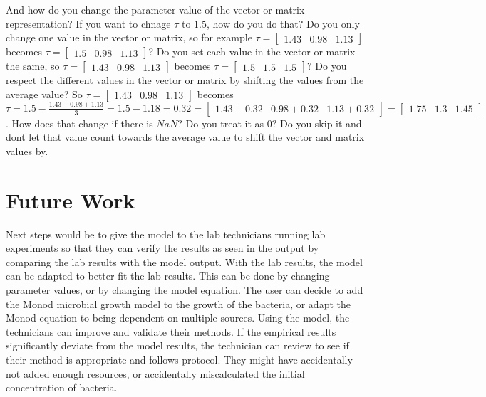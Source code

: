 And how do you change the parameter value of the vector or matrix representation? 
If you want to chnage $\tau$ to $1.5$, how do you do that? 
Do you only change one value in the vector or matrix, so for example $\tau = \begin{bmatrix} 1.43 & 0.98 & 1.13\end{bmatrix}$ becomes $\tau = \begin{bmatrix} 1.5 & 0.98 & 1.13\end{bmatrix}$? 
Do you set each value in the vector or matrix the same, so $\tau = \begin{bmatrix} 1.43 & 0.98 & 1.13\end{bmatrix}$ becomes $\tau = \begin{bmatrix} 1.5 & 1.5 & 1.5\end{bmatrix}$? 
Do you respect the different values in the vector or matrix by shifting the values from the average value? 
So $\tau = \begin{bmatrix} 1.43 & 0.98 & 1.13\end{bmatrix}$ becomes $\tau = 1.5 - \frac{1.43 + 0.98 + 1.13}{3} = 1.5-1.18 = 0.32 = \begin{bmatrix} 1.43+0.32 & 0.98+0.32 & 1.13+0.32\end{bmatrix} = \begin{bmatrix} 1.75 & 1.3 & 1.45\end{bmatrix}$. 
How does that change if there is $NaN$? 
Do you treat it as 0? 
Do you skip it and dont let that value count towards the average value to shift the vector and matrix values by. 

\section{Future Work}
\label{Future Work}
Next steps would be to give the model to the lab technicians running lab experiments so that they can verify the results as seen in the output by comparing the lab results with the model output. 
With the lab results, the model can be adapted to better fit the lab results. 
This can be done by changing parameter values, or by changing the model equation. 
The user can decide to add the Monod microbial growth model to the growth of the bacteria, or adapt the Monod equation to being dependent on multiple sources. 
Using the model, the technicians can improve and validate their methods. 
If the empirical results significantly deviate from the model results, the technician can review to see if their method is appropriate and follows protocol. 
They might have accidentally not added enough resources, or accidentally miscalculated the initial concentration of bacteria. 

